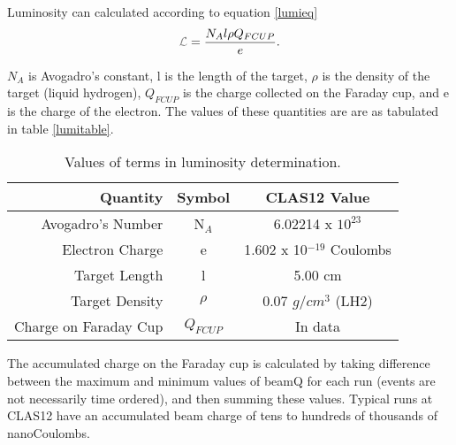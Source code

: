 



Luminosity can calculated according to equation \ref{lumieq}
 \begin{equation}\label{lumieq}
            \Lumi = \frac{N_A l \rho Q_{FCUP}}{e}.
\end{equation}

$N_A$ is Avogadro's constant, l is the length of the target,  $\rho$ is the density of the target (liquid hydrogen), $Q_{FCUP}$ is the charge collected on the Faraday cup, and e is the charge of the electron. The values of these quantities are are as tabulated in table \ref{lumitable}. 


\begin{table}[h]
    \centering
    \begin{tabular}{rcc}
        Quantity & Symbol & CLAS12 Value \\\hline
       Avogadro's Number &  N$_A$  & 6.02214 x $10^{23}$ \\
        Electron Charge &e  &  1.602 x 10$^{-19}$ Coulombs \\
        Target Length &l &  5.00 cm \\
        Target Density &$\rho$  &  0.07 $g/cm^3$ (LH2) \\
        Charge on Faraday Cup & $Q_{FCUP}$ &  In data\\
    \end{tabular}
\caption[Terms of Luminosity Equation]{Values of terms in luminosity determination.}
\end{table}\label{lumitable}

The accumulated charge on the Faraday cup is calculated by taking difference between the maximum and minimum values of beamQ for each run (events are not necessarily time ordered), and then summing these values. Typical runs at CLAS12 have an accumulated beam charge of tens to hundreds of thousands of nanoCoulombs. 

